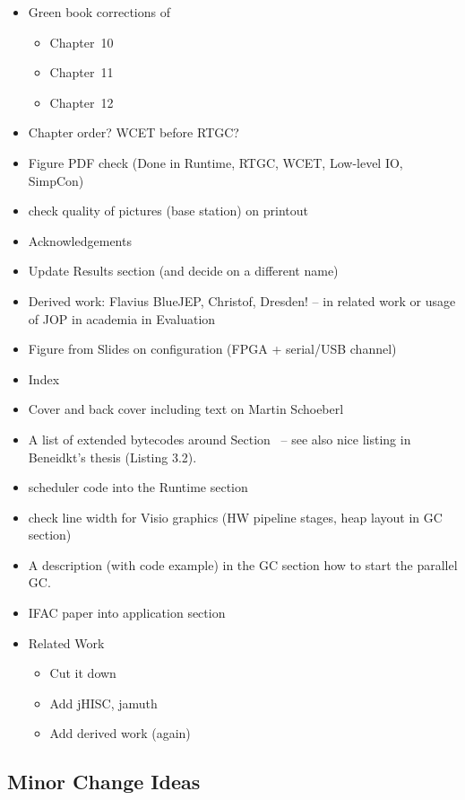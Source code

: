 \begin{itemize}
  \item Green book corrections of
  \begin{itemize}
    \item Chapter~10
    \item Chapter~11
    \item Chapter~12
  \end{itemize}
  \item Chapter order? WCET before RTGC?
    \item Figure PDF check (Done in Runtime, RTGC, WCET,
        Low-level IO, SimpCon)
    \item check quality of pictures (base station) on printout
    \item Acknowledgements
    \item Update Results section (and decide on a different name)
    \item Derived work: Flavius BlueJEP, Christof, Dresden! -- in
        related work or usage of JOP in academia in Evaluation
    \item Figure from Slides on configuration (FPGA + serial/USB
    channel)
    \item Index
    \item Cover and back cover including text on Martin Schoeberl
    \item A list of extended bytecodes around
        Section~\label{subsec:flex:bc} -- see also nice listing
        in Beneidkt's thesis (Listing 3.2).
    \item scheduler code into the Runtime section
    \item check line width for Visio graphics (HW pipeline
        stages, heap layout in GC section)
    \item A description (with code example) in the GC section how
        to start the parallel GC.
    \item IFAC paper into application section
    \item Related Work
    \begin{itemize}
        \item Cut it down
        \item Add jHISC, jamuth
        \item Add derived work (again)
    \end{itemize}
\end{itemize}

\subsection{Minor Change Ideas}

